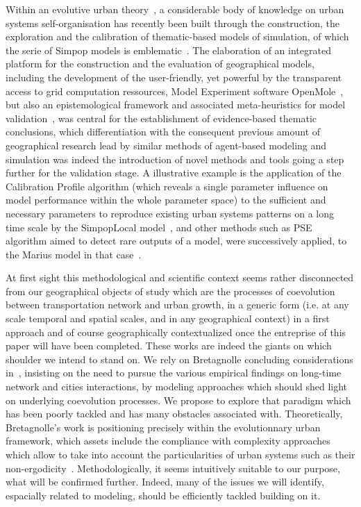 Within an evolutive urban theory~\cite{pumain2006evolutionary}, a considerable body of knowledge on urban systems self-organisation has recently been built through the construction, the exploration and the calibration of thematic-based models of simulation, of which the serie of Simpop models is emblematic~\cite{pumain2012multi}. The elaboration of an integrated platform for the construction and the evaluation of geographical models, including the development of the user-friendly, yet powerful by the transparent access to grid computation ressources, Model Experiment software OpenMole~\cite{reuillon2013openmole}, but also an epistemological framework and associated meta-heuristics for model validation~\cite{rey2015plateforme}, was central for the establishment of evidence-based thematic conclusions, which differentiation with the consequent previous amount of geographical research lead by similar methods of agent-based modeling and simulation was indeed the introduction of novel methods and tools going a step further for the validation stage. A illustrative example is the application of the Calibration Profile algorithm (which reveals a single parameter influence on model performance within the whole parameter space) to the sufficient and necessary parameters to reproduce existing urban systems patterns on a long time scale by the SimpopLocal model~\cite{schmitt2014half}, and other methods such as PSE algorithm aimed to detect rare outputs of a model, were successively applied, to the Marius model in that case~\cite{10.1371/journal.pone.0138212}.

At first sight this methodological and scientific context seems rather disconnected from our geographical objects of study which are the processes of coevolution between transportation network and urban growth, in a generic form (i.e. at any scale temporal and spatial scales, and in any geographical context) in a first approach and of course geographically contextualized once the entreprise of this paper will have been completed. These works are indeed the giants on which shoulder we intend to stand on. We rely on Bretagnolle concluding considerations in~\cite{bretagnolle:tel-00459720}, insisting on the need to pursue the various empirical findings on long-time network and cities interactions, by modeling approaches which should shed light on underlying coevolution processes. We propose to explore that paradigm which has been poorly tackled and has many obstacles associated with. Theoretically, Bretagnolle's work is positioning precisely within the evolutionnary urban framework, which assets include the compliance with complexity approaches which allow to take into account the particularities of urban systems such as their non-ergodicity~\cite{pumain2012urban}. Methodologically, it seems intuitively suitable to our purpose, what will be confirmed further. Indeed, many of the issues we will identify, espacially related to modeling, should be efficiently tackled building on it.



